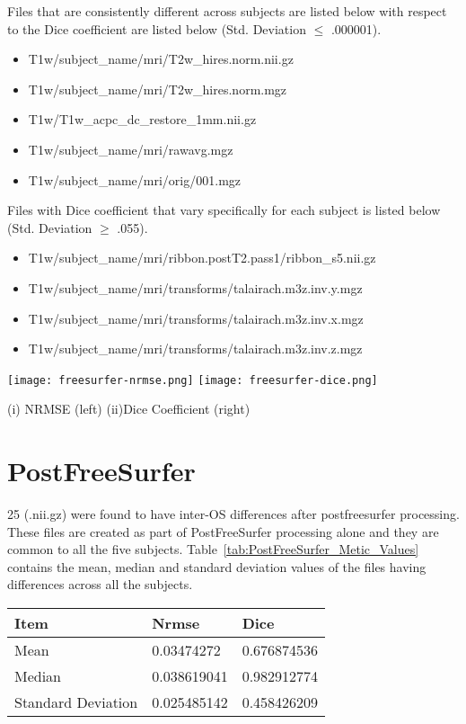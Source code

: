 Files that are consistently different across subjects are listed below with respect to the Dice coefficient are listed below (Std. Deviation $\leq$ .000001).
\begin{itemize}
  \item T1w/subject\_name/mri/T2w\_hires.norm.nii.gz
  \item T1w/subject\_name/mri/T2w\_hires.norm.mgz
  \item T1w/T1w\_acpc\_dc\_restore\_1mm.nii.gz
  \item T1w/subject\_name/mri/rawavg.mgz
  \item T1w/subject\_name/mri/orig/001.mgz
\end{itemize}

Files with Dice coefficient that vary specifically for each subject is listed below (Std. Deviation $\geq$ .055).
\begin{itemize}
\item T1w/subject\_name/mri/ribbon.postT2.pass1/ribbon\_s5.nii.gz
\item T1w/subject\_name/mri/transforms/talairach.m3z.inv.y.mgz
\item T1w/subject\_name/mri/transforms/talairach.m3z.inv.x.mgz
\item T1w/subject\_name/mri/transforms/talairach.m3z.inv.z.mgz
\end{itemize}
\hfill \break
\begin{center}
\texttt{[image: freesurfer-nrmse.png]}%
\texttt{[image: freesurfer-dice.png]}
\caption*{(i) NRMSE (left) (ii)Dice Coefficient (right)}
\label{fig:freesurfer_metric_values}
\end{center}

\section{PostFreeSurfer}\label{sec:Postfreesurfer}
25 (.nii.gz) were found to have inter-OS differences after postfreesurfer processing. These files are created as part of PostFreeSurfer processing alone and they are common to all the five subjects. Table~\ref{tab:PostFreeSurfer_Metic_Values} contains the mean, median and standard deviation values of the files having differences across all the subjects. 
\hfill \break
\begin{center}
\begin{tabular}{|l|l|l|}
\hline
  \textbf{Item}    & \textbf{Nrmse} & \textbf{Dice} \\ \hline
Mean               & 0.03474272     & 0.676874536   \\ \hline
Median             & 0.038619041    & 0.982912774   \\ \hline
Standard Deviation & 0.025485142    & 0.458426209   \\ \hline
\end{tabular}
\label{tab:PostFreeSurfer_Metic_Values}
\end{center}
\hfill \break

